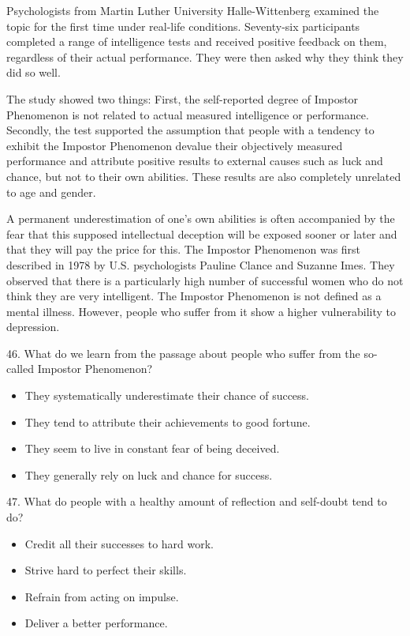 \documentclass[UTF8,11pt]{ctexart}
\begin{document}
Psychologists from Martin Luther University Halle-Wittenberg examined the topic for the first time under real-life conditions. Seventy-six participants completed a range of intelligence tests and received positive feedback on them, regardless of their actual performance. They were then asked why they think they did so well.


The study showed two things: First, the self-reported degree of Impostor Phenomenon is not related to actual measured intelligence or performance. Secondly, the test supported the assumption that people with a tendency to exhibit the Impostor Phenomenon devalue their objectively measured performance and attribute positive results to external causes such as luck and chance, but not to their own abilities. These results are also completely unrelated to age and gender.


A permanent underestimation of one’s own abilities is often accompanied by the fear that this supposed intellectual deception will be exposed sooner or later and that they will pay the price for this. The Impostor Phenomenon was first described in 1978 by U.S. psychologists Pauline Clance and Suzanne Imes. They observed that there is a particularly high number of successful women who do not think they are very intelligent. The Impostor Phenomenon is not defined as a mental illness. However, people who suffer from it show a higher vulnerability to depression.


46. What do we learn from the passage about people who suffer from the so-called Impostor Phenomenon?


\begin{itemize}[leftmargin=2em,itemsep=.2em,topsep=.4em]\item[A.] They systematically underestimate their chance of success.
\item[B.] They tend to attribute their achievements to good fortune.
\item[C.] They seem to live in constant fear of being deceived.
\item[D.] They generally rely on luck and chance for success.
\end{itemize}

47. What do people with a healthy amount of reflection and self-doubt tend to do?


\begin{itemize}[leftmargin=2em,itemsep=.2em,topsep=.4em]\item[A.] Credit all their successes to hard work.
\item[B.] Strive hard to perfect their skills.
\item[C.] Refrain from acting on impulse.
\item[D.] Deliver a better performance.
\end{itemize}
\end{document}

